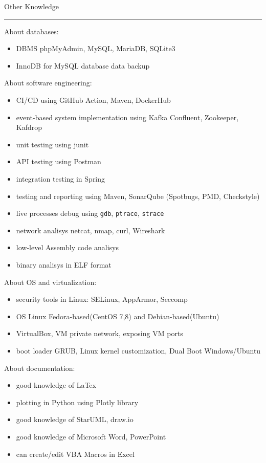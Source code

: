 \documentclass[a4paper]{letter}
\begin{document}
\hfill
\begin{minipage}[t]{0.65\textwidth}
\setlength{\baselineskip}{1.4\baselineskip}

\vspace{2 mm}
{\large Other Knowledge}
\rule{\linewidth}{0.4pt}
\vspace{1 mm}
{\medium About databases: }
\begin{itemize}
    \item DBMS phpMyAdmin, MySQL, MariaDB, SQLite3
    \item InnoDB for MySQL database data backup
\end{itemize}
\vspace{1 mm}
{\medium About software engineering: }
\begin{itemize}
    \item CI/CD using GitHub Action, Maven, DockerHub
    \item event-based system implementation using Kafka Confluent, Zookeeper, Kafdrop
    \item unit testing using junit
    \item API testing using Postman
    \item integration testing in Spring
    \item testing and reporting using Maven, SonarQube (Spotbugs, PMD, Checkstyle)
    \item live processes debug using \texttt{gdb}, \texttt{ptrace}, \texttt{strace}
    \item network analisys netcat, nmap, curl, Wireshark
    \item low-level Assembly code analisys
    \item binary analisys in ELF format
\end{itemize}
\vspace{1 mm}
{\medium About OS and virtualization: }
\begin{itemize}
    \item security tools in Linux: SELinux, AppArmor, Seccomp
    \item OS Linux Fedora-based(CentOS 7,8) and Debian-based(Ubuntu)  
    \item VirtualBox, VM private network, exposing VM ports
    \item boot loader GRUB, Linux kernel customization, Dual Boot Windows/Ubuntu
\end{itemize}
\vspace{1 mm}
{\medium About documentation: }
\begin{itemize}
    \item good knowledge of LaTex
    \item plotting in Python using Plotly library
    \item good knowledge of StarUML, draw.io 
    \item good knowledge of Microsoft Word, PowerPoint
    \item can create/edit VBA Macros in Excel
\end{itemize}

\end{minipage}
\end{document}
